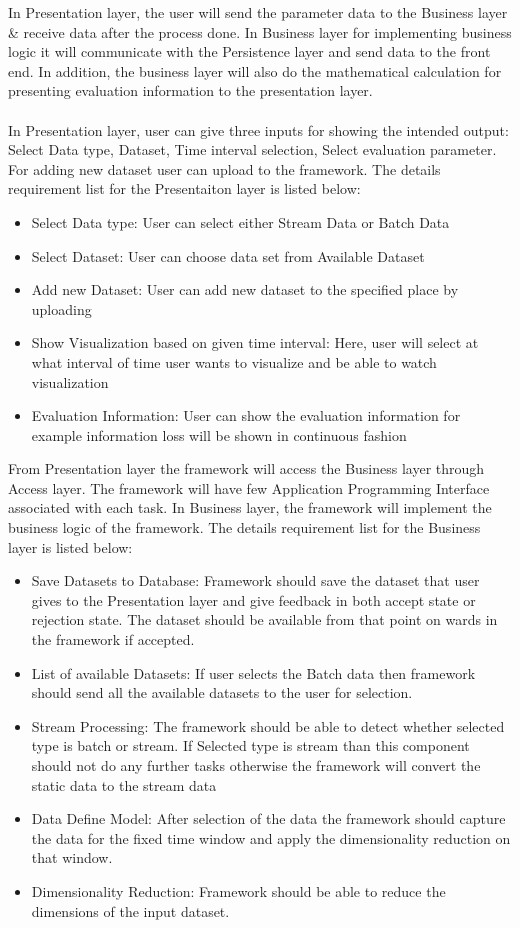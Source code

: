 In Presentation layer, the user will send the parameter data to the Business layer \& receive data after the process done. In Business layer for implementing business logic it will communicate with the Persistence layer and send data to the front end. In addition, the business layer will also do the mathematical calculation for presenting evaluation information to the presentation layer. \\\\
In Presentation layer, user can give three inputs for showing the intended output: Select Data type, Dataset, Time interval selection, Select evaluation parameter. For adding new dataset user can upload to the framework. The details requirement list for the Presentaiton layer is listed below:
\begin{itemize}
	\item Select Data type: User can select either Stream Data or Batch Data
	\item Select Dataset: User can choose data set from Available Dataset
	\item Add new Dataset: User can add new dataset to the specified place by uploading
	\item Show Visualization based on given time interval: Here, user will select at what interval of time user wants to visualize and be able to watch visualization
	\item Evaluation Information: User can show the evaluation information for example information loss will be shown in continuous fashion
\end{itemize}
From Presentation layer the framework will access the Business layer through Access layer. The framework will have few Application Programming Interface associated with each task. In Business layer, the framework will implement the business logic of the framework. The details requirement list for the Business layer is listed below:
\begin{itemize}
	\item Save Datasets to Database: Framework should save the dataset that user gives to the Presentation layer and give feedback in both accept state or rejection state. The dataset should be available from that point on wards in the framework if accepted.
	\item List of available Datasets: If user selects the Batch data then framework should send all the  available datasets to the user for selection.
	\item Stream Processing: The framework should be able to detect whether selected type is batch or stream. If Selected type is stream than this component should not do any further tasks otherwise the framework will convert the static data to the stream data
	\item Data Define Model: After selection of the data the framework should capture the data for the fixed time window and apply the dimensionality reduction on that window.
	\item Dimensionality Reduction: Framework should be able to reduce the dimensions of the input dataset.
\end{itemize}

